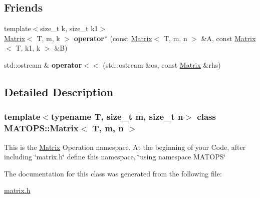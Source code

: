 \subsection*{Friends}
\begin{DoxyCompactItemize}
\item 
\mbox{\label{classMATOPS_1_1Matrix_a8949c2601fe3ea832623e6cee188c29d}} 
{\footnotesize template$<$size\+\_\+t k, size\+\_\+t k1$>$ }\\\hyperlink{classMATOPS_1_1Matrix}{Matrix}$<$ T, m, k $>$ {\bfseries operator$\ast$} (const \hyperlink{classMATOPS_1_1Matrix}{Matrix}$<$ T, m, n $>$ \&A, const \hyperlink{classMATOPS_1_1Matrix}{Matrix}$<$ T, k1, k $>$ \&B)
\item 
\mbox{\label{classMATOPS_1_1Matrix_ae239bcfdd34ba0b3693e1c11063afc6a}} 
std\+::ostream \& {\bfseries operator$<$$<$} (std\+::ostream \&os, const \hyperlink{classMATOPS_1_1Matrix}{Matrix} \&rhs)
\end{DoxyCompactItemize}


\subsection{Detailed Description}
\subsubsection*{template$<$typename T, size\+\_\+t m, size\+\_\+t n$>$\newline
class M\+A\+T\+O\+P\+S\+::\+Matrix$<$ T, m, n $>$}

This is the \hyperlink{classMATOPS_1_1Matrix}{Matrix} Operation namespace. At the beginning of your Code, after including \char`\"{}matrix.\+h\char`\"{} define this namespace, \char`\"{}using namespace M\+A\+T\+O\+P\+S\char`\"{} 

The documentation for this class was generated from the following file\+:\begin{DoxyCompactItemize}
\item 
\hyperlink{matrix_8h}{matrix.\+h}\end{DoxyCompactItemize}
